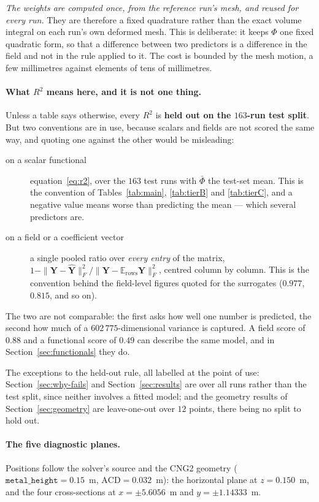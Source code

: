 \documentclass[11pt,a4paper]{article}
\newcommand{\vect}[1]{\mathbf{#1}}
\newcommand{\Exp}{\mathbb{E}}
\theoremstyle{plain}
\theoremstyle{definition}
\theoremstyle{remark}
\begin{document}
\emph{The weights are computed once, from the reference run's mesh, and reused
for every run.} They are therefore a fixed quadrature rather than the exact
volume integral on each run's own deformed mesh. This is deliberate: it keeps
$\Phi$ one fixed quadratic form, so that a difference between two predictors is
a difference in the field and not in the rule applied to it. The cost is
bounded by the mesh motion, a few millimetres against elements of tens of
millimetres.

\paragraph{What $R^2$ means here, and it is not one thing.} Unless a table says
otherwise, every $R^2$ is \textbf{held out on the $163$-run test split}. But two
conventions are in use, because scalars and fields are not scored the same way,
and quoting one against the other would be misleading:
\begin{description}
\item[on a scalar functional] equation~\eqref{eq:r2}, over the $163$ test runs
with $\bar\Phi$ the test-set mean. This is the convention of
Tables~\ref{tab:main}, \ref{tab:tierB} and \ref{tab:tierC}, and a negative value
means worse than predicting the mean --- which several predictors are.
\item[on a field or a coefficient vector] a single pooled ratio over
\emph{every entry} of the matrix, $1 - \|\vect{Y}-\hat{\vect{Y}}\|_F^2 /
\|\vect{Y}-\Exp_{\text{rows}}\vect{Y}\|_F^2$, centred column by column. This is
the convention behind the field-level figures quoted for the surrogates
($0.977$, $0.815$, and so on).
\end{description}
The two are not comparable: the first asks how well one number is predicted, the
second how much of a $602\,775$-dimensional variance is captured. A field score
of $0.88$ and a functional score of $0.49$ can describe the same model, and in
Section~\ref{sec:functionals} they do.

The exceptions to the held-out rule, all labelled at the point of use:
Section~\ref{sec:why-fails} and Section~\ref{sec:results} are over all runs
rather than the test split, since neither involves a fitted model; and the
geometry results of Section~\ref{sec:geometry} are leave-one-out over $12$
points, there being no split to hold out.

\paragraph{The five diagnostic planes.} Positions follow the solver's source and
the CNG2 geometry ($\texttt{metal\_height} = 0.15$~m, $\mathrm{ACD} = 0.032$~m):
the horizontal plane at $z = 0.150$~m, and the four cross-sections at
$x = \pm 5.6056$~m and $y = \pm 1.14333$~m.
\end{document}
